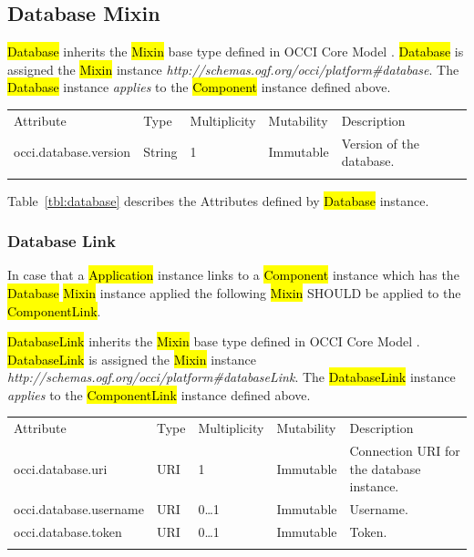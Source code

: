 \documentclass[10pt,a4paper]{article}
\begin{document}
\subsection{Database Mixin}

\hl{Database} inherits the \hl{Mixin} base type defined in OCCI Core Model \cite{occi:core}. \hl{Database} is assigned the \hl{Mixin} instance \textit{http://schemas.ogf.org/occi/platform\#database}. The \hl{Database} instance \textit{applies} to the \hl{Component} instance defined above.

{
	\begin{tabular}{lp{2.5cm}p{1cm}lp{5cm}}
	\toprule
	Attribute&Type&Multi\-plicity&Mutability&Description\\
	\colrule
	occi.database.version & String & 1 & Immutable & Version of the database.\\
	\botrule
	\end{tabular}
}

Table~\ref{tbl:database} describes the Attributes defined by \hl{Database} instance.

\subsubsection{Database Link}
In case that a \hl{Application} instance links to a \hl{Component} instance which has the \hl{Database} \hl{Mixin} instance applied the following \hl{Mixin} SHOULD be applied to the \hl{ComponentLink}.

\hl{DatabaseLink} inherits the \hl{Mixin} base type defined in OCCI Core Model \cite{occi:core}. \hl{DatabaseLink} is assigned the \hl{Mixin} instance \textit{http://schemas.ogf.org/occi/platform\#databaseLink}. The \hl{DatabaseLink} instance \textit{applies} to the \hl{ComponentLink} instance defined above.

{
	\begin{tabular}{lp{2.5cm}p{1cm}lp{5cm}}
	\toprule
	Attribute&Type&Multi\-plicity&Mutability&Description\\
	\colrule
	occi.database.uri & URI & 1 & Immutable & Connection URI for the database instance.\\
	occi.database.username & URI & 0\ldots1 & Immutable & Username.\\
	occi.database.token & URI & 0\ldots1 & Immutable & Token.\\
	\botrule
	\end{tabular}
}
\end{document}
